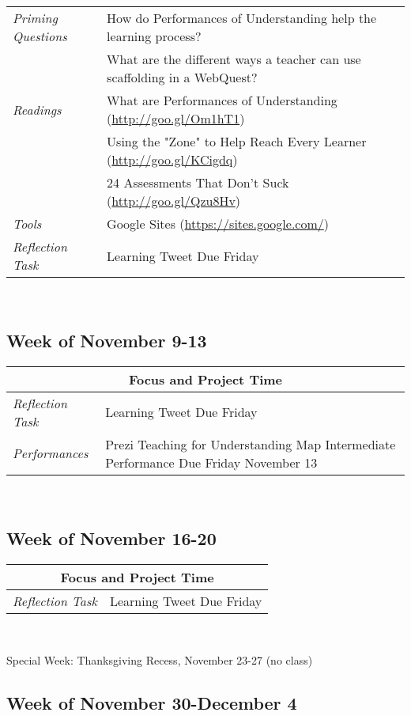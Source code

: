\documentclass{tufte-handout}
\newcommand{\tabpq}{\faQuestionCircle\medspace\textit{Priming Questions}}
\newcommand{\tabread}{\faBook\medspace\textit{Readings}}
\newcommand{\tabperformance}{\faTasks\medspace\textit{Performances}}
\newcommand{\tabtools}{\faWrench\medspace\textit{Tools}}
\newcommand{\tabtweet}{\faLightbulbO\medspace\textit{Reflection Task} & Learning Tweet Due Friday \\}
\newenvironment{tabsched}
	{\small
	\begin{tabular}{p{1.5in}p{4.5in}}
	\toprule}
	{\bottomrule
	\end{tabular}
	\normalsize\\}
\newenvironment{specweek}
	{\begin{center}
		\fontseries{b} \faBullhorn \medspace Special Week: }
		{\medspace \faBullhorn \fontseries{m}
	\end{center}}
\newcommand{\weekthirteen}{November 9-13}
\newcommand{\weekfourteen}{November 16-20}
\newcommand{\weekfifteen}{November 30-December 4}
\newcommand{\thanksgiving}{Thanksgiving Recess, November 23-27 (no class)}
\begin{document}
\begin{fullwidth}
\begin{tabsched}
	\tabpq & How do Performances of Understanding help the learning process? \\
	& What are the different ways a teacher can use scaffolding in a WebQuest? \\
	\midrule
	\tabread & What are Performances of Understanding (\url{http://goo.gl/Om1hT1}) \\
	& Using the "Zone" to Help Reach Every Learner (\url{http://goo.gl/KCigdq}) \\
	& 24 Assessments That Don't Suck (\url{http://goo.gl/Qzu8Hv}) \\
	\midrule
	\tabtools & Google Sites (\url{https://sites.google.com/}) \\
	\midrule
	\tabtweet
\end{tabsched}

\subsection{Week of \weekthirteen}

\begin{tabsched}
	\multicolumn{2}{c}{\faLaptop\medspace\textbf{Focus and Project Time}\medspace\faLaptop} \\
	\midrule
	\tabtweet
	\midrule
	\tabperformance & Prezi Teaching for Understanding Map Intermediate Performance Due Friday November 13 \\
\end{tabsched}

\subsection{Week of \weekfourteen}

\begin{tabsched}
	\multicolumn{2}{c}{\faLaptop\medspace\textbf{Focus and Project Time}\medspace\faLaptop} \\
	\midrule
	\tabtweet
\end{tabsched}

\begin{specweek}\thanksgiving\end{specweek}

\subsection{Week of \weekfifteen}


\end{fullwidth}
\end{document}
